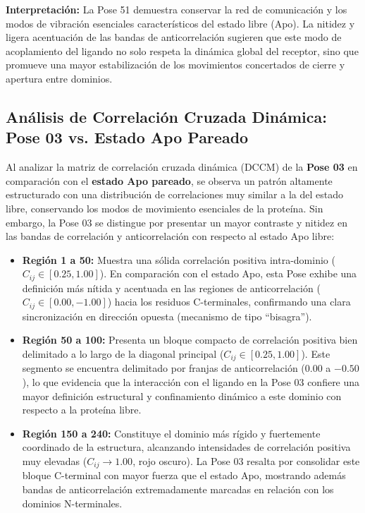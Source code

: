 \textbf{Interpretación:} La Pose 51 demuestra conservar la red de comunicación y los modos de vibración esenciales característicos del estado libre (Apo). La nitidez y ligera acentuación de las bandas de anticorrelación sugieren que este modo de acoplamiento del ligando no solo respeta la dinámica global del receptor, sino que promueve una mayor estabilización de los movimientos concertados de cierre y apertura entre dominios.

\subsection*{Análisis de Correlación Cruzada Dinámica: Pose 03 vs. Estado Apo Pareado}

Al analizar la matriz de correlación cruzada dinámica (DCCM) de la \textbf{Pose 03} en comparación con el \textbf{estado Apo pareado}, se observa un patrón altamente estructurado con una distribución de correlaciones muy similar a la del estado libre, conservando los modos de movimiento esenciales de la proteína. Sin embargo, la Pose 03 se distingue por presentar un mayor contraste y nitidez en las bandas de correlación y anticorrelación con respecto al estado Apo libre:

\begin{itemize}
    \item \textbf{Región 1 a 50:} Muestra una sólida correlación positiva intra-dominio ($C_{ij} \in [0.25, 1.00]$). En comparación con el estado Apo, esta Pose exhibe una definición más nítida y acentuada en las regiones de anticorrelación ($C_{ij} \in [0.00, -1.00]$) hacia los residuos C-terminales, confirmando una clara sincronización en dirección opuesta (mecanismo de tipo ``bisagra'').
    
    \item \textbf{Región 50 a 100:} Presenta un bloque compacto de correlación positiva bien delimitado a lo largo de la diagonal principal ($C_{ij} \in [0.25, 1.00]$). Este segmento se encuentra delimitado por franjas de anticorrelación ($0.00$ a $-0.50$), lo que evidencia que la interacción con el ligando en la Pose 03 confiere una mayor definición estructural y confinamiento dinámico a este dominio con respecto a la proteína libre.
    
    \item \textbf{Región 150 a 240:} Constituye el dominio más rígido y fuertemente coordinado de la estructura, alcanzando intensidades de correlación positiva muy elevadas ($C_{ij} \to 1.00$, rojo oscuro). La Pose 03 resalta por consolidar este bloque C-terminal con mayor fuerza que el estado Apo, mostrando además bandas de anticorrelación extremadamente marcadas en relación con los dominios N-terminales.
\end{itemize}

